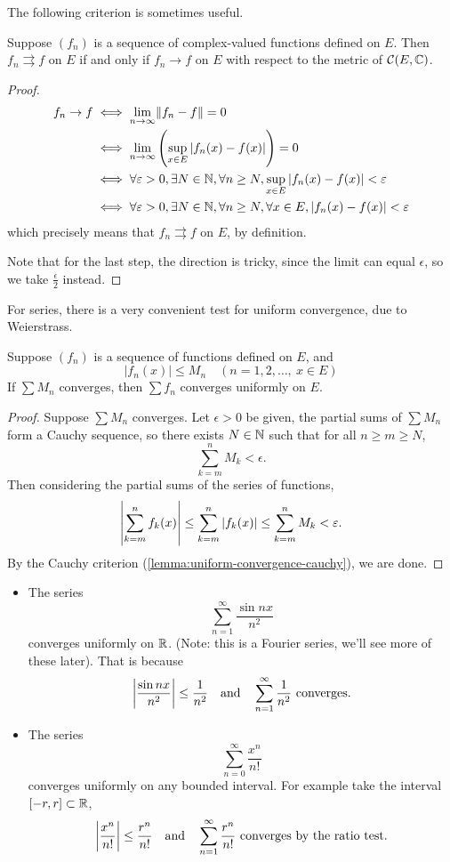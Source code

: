 The following criterion is sometimes useful.

\begin{lemma}
Suppose $(f_n)$ is a sequence of complex-valued functions defined on $E$. Then $f_n\rightrightarrows f$ on $E$ if and only if $f_n\to f$ on $E$ with respect to the metric of $\mathcal{C}(E,\mathbb C)$.
\end{lemma}

\begin{proof}
\begin{align*}
f_n\to f
&\iff\lim_{n\to\infty}\norm{f_n-f}=0\\
&\iff\lim_{n\to\infty}\left(\sup_{x\in E}|f_n(x)-f(x)|\right)=0\\
&\iff\forall\varepsilon>0,\exists N\in\mathbb N,\forall n\ge N,\sup_{x\in E}|f_n(x)-f(x)|<\varepsilon\\
&\iff\forall\varepsilon>0,\exists N\in\mathbb N,\forall n\ge N,\forall x\in E,|f_n(x)-f(x)|<\varepsilon
\end{align*}
which precisely means that $f_n\rightrightarrows f$ on $E$, by definition.

Note that for the last step, the \fbox{$\impliedby$} direction is tricky, since the limit can equal $\epsilon$, so we take $\frac{\epsilon}{2}$ instead.
\end{proof}

For series, there is a very convenient test for uniform convergence, due to Weierstrass.

\begin{lemma}
Suppose $(f_n)$ is a sequence of functions defined on $E$, and 
\[|f_n(x)|\le M_n\quad(n=1,2,\dots,\:x\in E)\]
If $\sum M_n$ converges, then $\sum f_n$ converges uniformly on $E$.
\end{lemma}

\begin{proof}
Suppose $\sum M_n$ converges. Let $\epsilon>0$ be given, the partial sums of $\sum M_n$ form a Cauchy sequence, so there exists $N\in\mathbb N$ such that for all $n\ge m\ge N$,
\[\sum_{k=m}^{n}M_k<\epsilon.\]
Then considering the partial sums of the series of functions,
\[\left|\sum_{k=m}^{n}f_k(x)\right|\le\sum_{k=m}^{n}|f_k(x)|\le\sum_{k=m}^{n}M_k<\varepsilon.\]
By the Cauchy criterion (\cref{lemma:uniform-convergence-cauchy}), we are done.
\end{proof}

\begin{example}
\begin{itemize}
\item The series
\[\sum_{n=1}^{\infty}\frac{\sin nx}{n^2}\]
converges uniformly on $\mathbb R$. (Note: this is a Fourier series, we'll see more of these later). That is because
\[\left|\frac{\sin nx}{n^2}\right|\le\frac{1}{n^2}\quad\text{and}\quad\sum_{n=1}^{\infty}\frac{1}{n^2}\text{ converges}.\]

\item The series
\[\sum_{n=0}^{\infty}\frac{x^n}{n!}\]
converges uniformly on any bounded interval. For example take the interval $[-r,r]\subset\mathbb R$,
\[\left|\frac{x^n}{n!}\right|\le\frac{r^n}{n!}\quad\text{and}\quad\sum_{n=1}^{\infty}\frac{r^n}{n!}\text{ converges by the ratio test.}\]
\end{itemize}
\end{example}
\pagebreak

